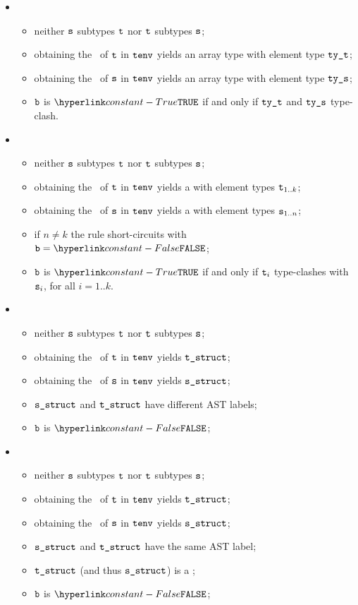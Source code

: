 \begin{itemize}
  \item {}
  \begin{itemize}
    \item neither $\texttt{s}$ subtypes $\texttt{t}$ nor $\texttt{t}$ subtypes $\texttt{s}$;
    \item obtaining the \structure\ of $\texttt{t}$ in $\texttt{tenv}$ yields an array type with element type $\texttt{ty\_t}$;
    \item obtaining the \structure\ of $\texttt{s}$ in $\texttt{tenv}$ yields an array type with element type $\texttt{ty\_s}$;
    \item $\texttt{b}$ is $\True$ if and only if $\texttt{ty\_t}$ and $\texttt{ty\_s}$ type-clash.
  \end{itemize}

  \item {}
  \begin{itemize}
    \item neither $\texttt{s}$ subtypes $\texttt{t}$ nor $\texttt{t}$ subtypes $\texttt{s}$;
    \item obtaining the \structure\ of $\texttt{t}$ in $\texttt{tenv}$ yields a \tupletypeterm{} with element types $\texttt{t}_{1..k}$;
    \item obtaining the \structure\ of $\texttt{s}$ in $\texttt{tenv}$ yields a \tupletypeterm{} with element types $\texttt{s}_{1..n}$;
    \item if $n \neq k$ the rule short-circuits with $\vb=\False$;
    \item $\texttt{b}$ is $\True$ if and only if $\texttt{t}_i$ type-clashes with $\texttt{s}_i$, for all $i=1..k$.
  \end{itemize}

  \item {}
  \begin{itemize}
    \item neither $\texttt{s}$ subtypes $\texttt{t}$ nor $\texttt{t}$ subtypes $\texttt{s}$;
    \item obtaining the \structure\ of $\texttt{t}$ in $\texttt{tenv}$ yields $\texttt{t\_struct}$;
    \item obtaining the \structure\ of $\texttt{s}$ in $\texttt{tenv}$ yields $\texttt{s\_struct}$;
    \item $\texttt{s\_struct}$ and $\texttt{t\_struct}$ have different AST labels;
    \item $\texttt{b}$ is $\False$;
  \end{itemize}

  \item {}
  \begin{itemize}
    \item neither $\texttt{s}$ subtypes $\texttt{t}$ nor $\texttt{t}$ subtypes $\texttt{s}$;
    \item obtaining the \structure\ of $\texttt{t}$ in $\texttt{tenv}$ yields $\texttt{t\_struct}$;
    \item obtaining the \structure\ of $\texttt{s}$ in $\texttt{tenv}$ yields $\texttt{s\_struct}$;
    \item $\texttt{s\_struct}$ and $\texttt{t\_struct}$ have the same AST label;
    \item $\texttt{t\_struct}$ (and thus $\texttt{s\_struct}$) is a \structuredtype;
    \item $\texttt{b}$ is $\False$;
  \end{itemize}
\end{itemize}


